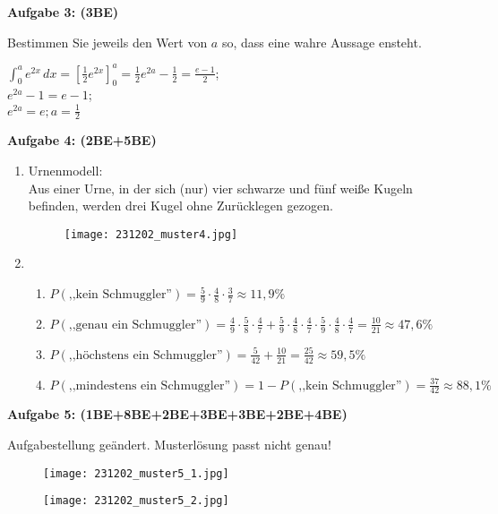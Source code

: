 \documentclass[a4paper,12pt]{article}
\newcommand{\Aufgabe}[1]{
  {
  \vspace*{0.5cm}
  \textsf{\textbf{Aufgabe #1}}
  \vspace*{0.2cm}
  
  }
}
\begin{document}
\Aufgabe{3: (3BE)}
Bestimmen Sie jeweils den Wert von $a$ so, dass eine wahre Aussage ensteht.

$\int_0^a e^{2x}\, dx=[\frac{1}{2}e^{2x}]_0^a=\frac{1}{2}e^{2a}-\frac{1}{2}=\frac{e-1}{2}$;\\
$e^{2a}-1=e-1$;\\
$e^{2a}=e; a=\frac{1}{2}$

\newpage
\Aufgabe{4: (2BE+5BE)} %
\begin{enumerate}[label={\alph*)}]
  \item Urnenmodell:\\
    Aus einer Urne, in der sich (nur) vier schwarze und fünf weiße Kugeln befinden, werden drei Kugel ohne Zurücklegen gezogen.
  \begin{figure}[H]
    \vspace{0cm}
    \centering
    \texttt{[image: 231202\_muster4.jpg]}
  \end{figure}
  \item
      \begin{enumerate}[label={(\arabic*)}]
        \item $P(\text{,,kein Schmuggler''})=\frac{5}{9}\cdot\frac{4}{8}\cdot\frac{3}{7}\approx 11,9\%$
        \item $P(\text{,,genau ein Schmuggler''})=\frac{4}{9}\cdot\frac{5}{8}\cdot\frac{4}{7}+\frac{5}{9}\cdot\frac{4}{8}\cdot\frac{4}{7}\cdot\frac{5}{9}\cdot\frac{4}{8}\cdot\frac{4}{7}=\frac{10}{21}\approx 47,6\%$
        \item $P(\text{,,höchstens ein Schmuggler''})=\frac{5}{42}+\frac{10}{21}=\frac{25}{42}\approx 59,5\%$
        \item $P(\text{,,mindestens ein Schmuggler''})=1-P(\text{,,kein Schmuggler''})=\frac{37}{42}\approx 88,1\%$
      \end{enumerate}
\end{enumerate}

\newpage
\Aufgabe{5: (1BE+8BE+2BE+3BE+3BE+2BE+4BE)} %
Aufgabestellung geändert. Musterlösung passt nicht genau!
  \begin{figure}[H]
    \vspace{0cm}
    \centering
    \texttt{[image: 231202\_muster5\_1.jpg]}
  \end{figure}
  \begin{figure}[H]
    \vspace{0cm}
    \centering
    \texttt{[image: 231202\_muster5\_2.jpg]}
  \end{figure}
\end{document}
